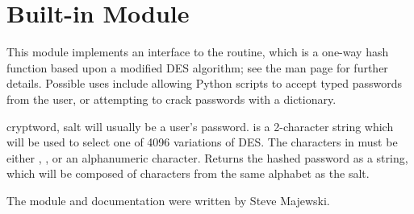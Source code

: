 \section{Built-in Module }



This module implements an interface to the  routine,
which is a one-way hash function based upon a modified DES algorithm;
see the \UNIX{} man page for further details.  Possible uses include
allowing Python scripts to accept typed passwords from the user, or
attempting to crack \UNIX{} passwords with a dictionary.

\begin{funcdesc}{crypt}{word, salt} 
 will usually be a user's password.   is a
2-character string which will be used to select one of 4096 variations
of DES.  The characters in  must be
either , \code{/}, or an alphanumeric character.  Returns the
hashed password as a string, which will be composed of characters from
the same alphabet as the salt.
\end{funcdesc}

The module and documentation were written by Steve Majewski.

